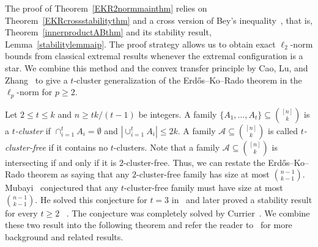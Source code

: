 \documentclass[10pt,a4paper]{amsart}
\numberwithin{equation}{section}
\def\A{\mathcal{A}}
\begin{document}
The proof of Theorem~\ref{EKR2normmainthm} relies on Theorem~\ref{EKRcrossstabilitythm}
and a cross version of Bey's inequality~\cite{Bey}, that is, Theorem~\ref{innerproductABthm} and its stability result, Lemma~\ref{stabilitylemmaip}.
The proof strategy allows us to obtain exact $\ell_2$-norm bounds from
classical extremal results whenever the extremal configuration is a star.
We combine this method and the convex transfer principle by Cao, Lu, and Zhang~\cite{Cao}
to give a $t$-cluster generalization of the Erd\H{o}s--Ko--Rado theorem in the $\ell_p$-norm for $p\geq2$.











Let $2\leq t\leq k$ and $n\geq tk/(t-1)$ be integers.
A family $\{A_1,\ldots, A_t\}\subseteq \binom{[n]}{k}$ is a {\em $t$-cluster} if
$ \cap_{i=1}^t A_i=\emptyset$ and $\left|\cup_{i=1}^t A_i\right|\leq 2k$.
A family $\mathcal{A} \subseteq \binom{[n]}{k}$ is called {\em $t$-cluster-free} if it contains no $t$-clusters.
Note that a family $\mathcal{A} \subseteq \binom{[n]}{k}$ is intersecting if and only if it is $2$-cluster-free.
Thus, we can restate the Erd\H{o}s--Ko--Rado theorem as saying that any $2$-cluster-free family has size at most $\binom{n-1}{k-1}$.
Mubayi~\cite{Mubayi2006} conjectured that any $t$-cluster-free family must have size at most $\binom{n-1}{k-1}$.
He solved this conjecture for $t=3$ in~\cite{Mubayi2006} and later proved  a stability result for every $t\geq 2$ ~\cite[Theorem 2]{Mubayi2007}.
The conjecture was completely solved by Currier~\cite[Theorem 2]{Currier}.
We combine these two result into the following theorem and refer the reader to~\cite{Currier,Mubayi2006,Mubayi2007} for more background and related results.
\end{document}
